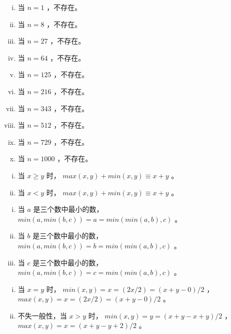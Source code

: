 {{        %
        \begin{practices}
            \begin{enumerate}[i.]
                \item 当 $n = 1$ ，不存在。
                \item 当 $n = 8$ ，不存在。
                \item 当 $n = 27$ ，不存在。
                \item 当 $n = 64$ ，不存在。
                \item 当 $n = 125$ ，不存在。
                \item 当 $n = 216$ ，不存在。
                \item 当 $n = 343$ ，不存在。
                \item 当 $n = 512$ ，不存在。
                \item 当 $n = 729$ ，不存在。
                \item 当 $n = 1000$ ，不存在。
            \end{enumerate}
        \end{practices}

        \begin{practices}
            \begin{enumerate}[i.]
                \item 当 $x \geq y$ 时， $max(x, y) + min(x, y) \equiv x + y$ 。
                \item 当 $x < y$ 时， $max(x, y) + min(x, y) \equiv x + y$ 。
            \end{enumerate}
        \end{practices}

        \begin{practices}
            \begin{enumerate}[i.]
                \item 当 $a$ 是三个数中最小的数， $min(a, min(b, c)) = a = min(min(a, b), c)$ 。
                \item 当 $b$ 是三个数中最小的数， $min(a, min(b, c)) = b = min(min(a, b), c)$ 。
                \item 当 $c$ 是三个数中最小的数， $min(a, min(b, c)) = c = min(min(a, b), c)$ 。
            \end{enumerate}
        \end{practices}

        \begin{practices}
            \begin{enumerate}[i.]
                \item 当 $x = y$ 时， $min(x, y) = x = (2x / 2) = (x + y - 0) / 2$ ， $max(x, y) = x = (2x / 2) = (x + y - 0) / 2$ 。
                \item 不失一般性，当 $x > y$ 时， $min(x, y) = y = (x + y - x + y) / 2$ ， $max(x, y) = x = (x + y - y + 2) / 2$ 。
            \end{enumerate}
        \end{practices}

}}
